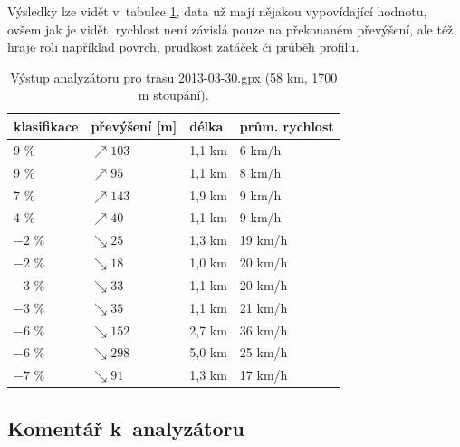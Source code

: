 \documentclass[thesis=B,czech]{FITthesis}[2012/06/26]
\begin{document}
Výsledky lze vidět v~tabulce \ref{table:vystupAnalyzatoru}, data už mají nějakou vypovídající hodnotu, ovšem jak je vidět, rychlost není závislá pouze na překonaném převýšení, ale též hraje roli například povrch, prudkost zatáček či průběh profilu.

\begin{table}[h!]
\begin{tabular}{l|l|l|l} %
\textbf{klasifikace}	&	\textbf{převýšení [m]}	&	\textbf{délka}	&	\textbf{prům. rychlost}	\\
\hline
9 \%	&	$\nearrow103$	&	1,1 km	&	6 km/h	\\
9 \%	&	$\nearrow95$	&	1,1 km	&	8 km/h	\\
7 \%	&	$\nearrow143$	&	1,9 km	&	9 km/h	\\
4 \%	&	$\nearrow40$	&	1,1 km	&	9 km/h	\\
$-2$ \%	&	$\searrow25$	&	1,3 km	&	19 km/h	\\
$-2$ \%	&	$\searrow18$	&	1,0 km	&	20 km/h	\\
$-3$ \%	&	$\searrow33$	&	1,1 km	&	20 km/h	\\
$-3$ \%	&	$\searrow35$	&	1,1 km	&	21 km/h	\\
$-6$ \%	&	$\searrow152$	&	2,7 km	&	36 km/h	\\
$-6$ \%	&	$\searrow298$	&	5,0 km	&	25 km/h	\\
$-7$ \%	&	$\searrow91$	&	1,3 km	&	17 km/h	 \\
\end{tabular}
\caption{Výstup analyzátoru pro trasu 2013-03-30.gpx (58 km, 1700 m stoupání).}
\label{table:vystupAnalyzatoru}
\end{table}


\subsection{Komentář k~analyzátoru}
\end{document}
